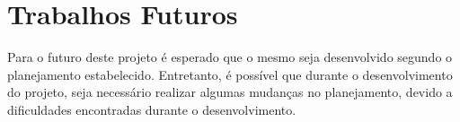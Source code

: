 \section{Trabalhos Futuros}
    \label{sec:trabalhos-futuros}

    Para o futuro deste projeto é esperado que o mesmo seja desenvolvido segundo o planejamento estabelecido. Entretanto, é possível que durante o desenvolvimento do projeto, seja necessário realizar algumas mudanças no planejamento, devido a dificuldades encontradas durante o desenvolvimento.
